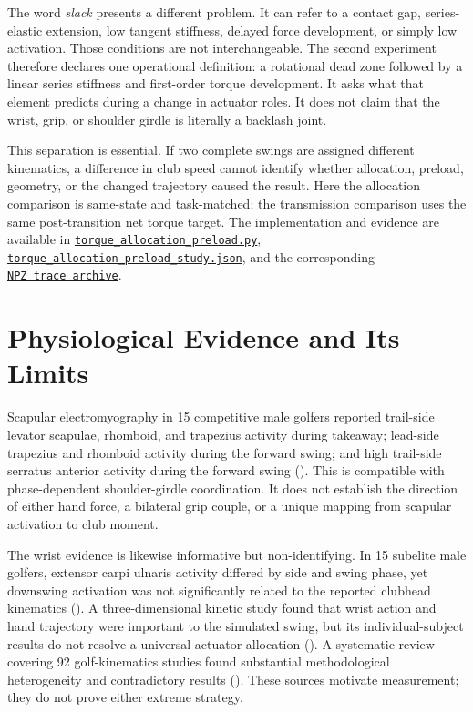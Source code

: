 \documentclass[
  letterpaper,
]{report}
\begin{document}
The word \emph{slack} presents a different problem. It can refer to a
contact gap, series-elastic extension, low tangent stiffness, delayed
force development, or simply low activation. Those conditions are not
interchangeable. The second experiment therefore declares one
operational definition: a rotational dead zone followed by a linear
series stiffness and first-order torque development. It asks what that
element predicts during a change in actuator roles. It does not claim
that the wrist, grip, or shoulder girdle is literally a backlash joint.

This separation is essential. If two complete swings are assigned
different kinematics, a difference in club speed cannot identify whether
allocation, preload, geometry, or the changed trajectory caused the
result. Here the allocation comparison is same-state and task-matched;
the transmission comparison uses the same post-transition net torque
target. The implementation and evidence are available in
\href{https://github.com/D-sorganization/UpstreamDrift/blob/main/scripts/research/proximal_distal_energy/torque_allocation_preload.py}{\texttt{torque\_allocation\_preload.py}},
\href{https://github.com/D-sorganization/UpstreamDrift/blob/main/docs/research/proximal_distal_energy_transfer/data/torque_allocation_preload_study.json}{\texttt{torque\_allocation\_preload\_study.json}},
and the corresponding
\href{https://github.com/D-sorganization/UpstreamDrift/blob/main/docs/research/proximal_distal_energy_transfer/data/torque_allocation_preload_study.npz}{\texttt{NPZ\ trace\ archive}}.

\section{Physiological Evidence and Its
Limits}\label{physiological-evidence-and-its-limits}

Scapular electromyography in 15 competitive male golfers reported
trail-side levator scapulae, rhomboid, and trapezius activity during
takeaway; lead-side trapezius and rhomboid activity during the forward
swing; and high trail-side serratus anterior activity during the forward
swing (). This is
compatible with phase-dependent shoulder-girdle coordination. It does
not establish the direction of either hand force, a bilateral grip
couple, or a unique mapping from scapular activation to club moment.

The wrist evidence is likewise informative but non-identifying. In 15
subelite male golfers, extensor carpi ulnaris activity differed by side
and swing phase, yet downswing activation was not significantly related
to the reported clubhead kinematics
(). A three-dimensional
kinetic study found that wrist action and hand trajectory were important
to the simulated swing, but its individual-subject results do not
resolve a universal actuator allocation
(). A systematic review covering
92 golf-kinematics studies found substantial methodological
heterogeneity and contradictory results
(). These sources
motivate measurement; they do not prove either extreme strategy.
\end{document}
